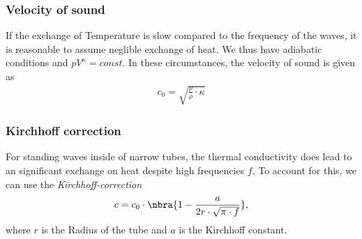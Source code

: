 \documentclass{subfiles}
\begin{document}
        \subsubsection*{Velocity of sound}
            If the exchange of Temperature is slow compared to the frequency of the waves, it is reasonable to assume neglible exchange of heat. We thus have adiabatic conditions and $pV^\kappa=const.$ In these circumstances, the velocity of sound is given as 
            \begin{align*}
                c_{0}=\sqrt{\frac{p}{\rho}\cdot\kappa}
            \end{align*}

        \subsubsection*{Kirchhoff correction}
            For standing waves inside of narrow tubes, the thermal conductivity does lead to an significant exchange on heat despite high frequencies $f$. To account for this, we can use the \textit{Kirchhoff-correction}
            \begin{align*}
                c=c_0\cdot\nbra{1-\frac{a}{2r\cdot\sqrt{\pi\cdot f}}},
            \end{align*}
            where $r$ is the Radius of the tube and $a$ is the Kirchhoff constant.


\end{document}
